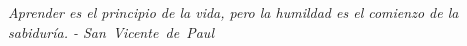 \thispagestyle{empty}
\null\vfill
\begin{flushright}

{\large \textit{Aprender es el principio de la vida, pero la humildad es el comienzo de la sabiduría. - San Vicente de Paul}}

\end{flushright}
